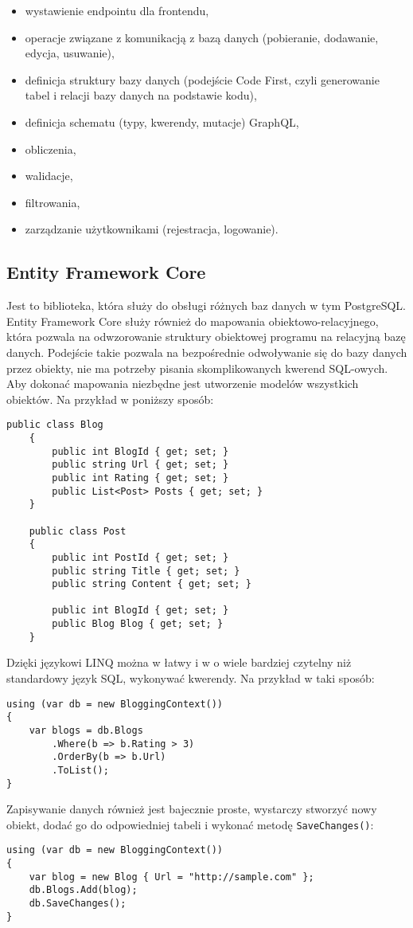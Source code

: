 \begin{itemize}
    \item wystawienie endpointu dla frontendu,
    \item operacje związane z komunikacją z bazą danych (pobieranie, dodawanie, edycja, usuwanie),
    \item definicja struktury bazy danych (podejście Code First, czyli generowanie tabel i relacji bazy danych na podstawie kodu),
    \item definicja schematu (typy, kwerendy, mutacje) GraphQL,
    \item obliczenia,
    \item walidacje,
    \item filtrowania,
    \item zarządzanie użytkownikami (rejestracja, logowanie).
\end{itemize}

\subsection{Entity Framework Core}
Jest to biblioteka, która służy do obsługi różnych baz danych w tym PostgreSQL. Entity Framework Core służy również do mapowania obiektowo-relacyjnego, która pozwala na odwzorowanie struktury obiektowej programu na relacyjną bazę danych.\cite{efcore} Podejście takie pozwala na bezpośrednie odwoływanie się do bazy danych przez obiekty, nie ma potrzeby pisania skomplikowanych kwerend SQL-owych. Aby dokonać mapowania niezbędne jest utworzenie modelów wszystkich obiektów. Na przykład w poniższy sposób:
\begin{lstlisting}[language={[Sharp]C}]
public class Blog
    {
        public int BlogId { get; set; }
        public string Url { get; set; }
        public int Rating { get; set; }
        public List<Post> Posts { get; set; }
    }

    public class Post
    {
        public int PostId { get; set; }
        public string Title { get; set; }
        public string Content { get; set; }

        public int BlogId { get; set; }
        public Blog Blog { get; set; }
    }
\end{lstlisting}
Dzięki językowi LINQ można w łatwy i w o wiele bardziej czytelny niż standardowy język SQL, wykonywać kwerendy. Na przykład w taki sposób:
\begin{lstlisting}[language={[Sharp]C}]
   using (var db = new BloggingContext())
{
    var blogs = db.Blogs
        .Where(b => b.Rating > 3)
        .OrderBy(b => b.Url)
        .ToList();
}
\end{lstlisting}
Zapisywanie danych również jest bajecznie proste, wystarczy stworzyć nowy obiekt, dodać go do odpowiedniej tabeli i wykonać metodę \texttt{SaveChanges()}:
\begin{lstlisting}[language={[Sharp]C}]
using (var db = new BloggingContext())
{
    var blog = new Blog { Url = "http://sample.com" };
    db.Blogs.Add(blog);
    db.SaveChanges();
}
\end{lstlisting}

